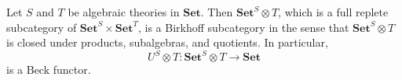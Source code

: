 Let $S$ and $T$ be algebraic theories in $\mathbf{Set}$. Then $\mathbf{Set}^S \otimes T$, which is a full replete subcategory of $\mathbf{Set}^S \times \mathbf{Set}^T$, is a Birkhoff subcategory in the sense that $\mathbf{Set}^S \otimes T$ is closed under products, subalgebras, and quotients. In particular,
$$
U^S \otimes T: \mathbf{Set}^S \otimes T \to \mathbf{Set}
$$
is a Beck functor.
